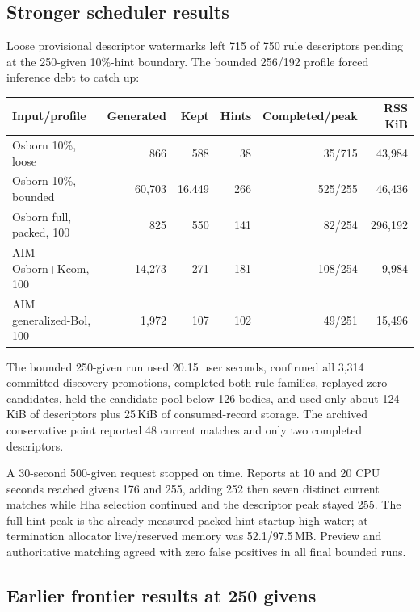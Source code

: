 \documentclass[11pt]{article}
\begin{document}
\subsection{Stronger scheduler results}

Loose provisional descriptor watermarks left 715 of 750 rule descriptors
pending at the 250-given 10\%-hint boundary.  The bounded 256/192 profile
forced inference debt to catch up:

\begin{center}
\small
\begin{tabular}{lrrrrr}
\toprule
Input/profile & Generated & Kept & Hints & Completed/peak & RSS KiB \\
\midrule
Osborn 10\%, loose & 866 & 588 & 38 & 35/715 & 43,984 \\
Osborn 10\%, bounded & 60,703 & 16,449 & 266 & 525/255 & 46,436 \\
Osborn full, packed, 100 & 825 & 550 & 141 & 82/254 & 296,192 \\
AIM Osborn+Kcom, 100 & 14,273 & 271 & 181 & 108/254 & 9,984 \\
AIM generalized-Bol, 100 & 1,972 & 107 & 102 & 49/251 & 15,496 \\
\bottomrule
\end{tabular}
\end{center}

The bounded 250-given run used 20.15 user seconds, confirmed all 3,314
committed discovery promotions, completed both rule families, replayed zero
candidates, held the candidate pool below 126 bodies, and used only about
124\,KiB of descriptors plus 25\,KiB of consumed-record storage.  The
archived conservative point reported 48 current matches and only two completed
descriptors.

A 30-second 500-given request stopped on time.  Reports at 10 and 20 CPU
seconds reached givens 176 and 255, adding 252 then seven distinct current
matches while Hha selection continued and the descriptor peak stayed 255.
The full-hint peak is the already measured packed-hint startup high-water; at
termination allocator live/reserved memory was 52.1/97.5\,MB.  Preview and
authoritative matching agreed with zero false positives in all final bounded
runs.

\subsection{Earlier frontier results at 250 givens}
\end{document}
